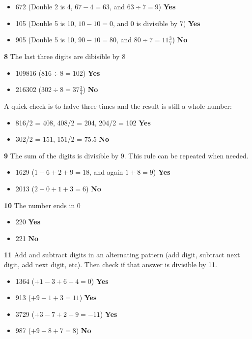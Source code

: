 \begin{itemize}
  \item 672 (Double 2 is 4, $67-4=63$, and $63 \div 7 = 9$) \textbf{Yes}
  \item 105 (Double 5 is 10, $10-10=0$, and 0 is divisible by 7) \textbf{Yes}
  \item 905 (Double 5 is 10, $90-10=80$, and $80 \div 7 =11\frac{3}{7}$) \textbf{No}
\end{itemize}

\vspace{7 mm}

\textbf{8} The last three digits are dibisible by 8

\begin{itemize}
  \item 109816 ($816 \div 8=102$) \textbf{Yes}
  \item 216302 ($302\div 8=37\frac{3}{4}$) \textbf{No}
\end{itemize}

A quick check is to halve three times and the result is still a whole number:

\begin{itemize}
  \item 816/2 = 408, 408/2 = 204, 204/2 = 102 \textbf{Yes}
  \item 302/2 = 151, 151/2 = 75.5 \textbf{No}
\end{itemize}

\vspace{7 mm}

\textbf{9} The sum of the digits is divisible by 9. This rule can be repeated when needed.

\begin{itemize}
  \item 1629 ($1+6+2+9=18$, and again $1+8=9$) \textbf{Yes}
  \item 2013 ($2+0+1+3=6$) \textbf{No}
\end{itemize}

\textbf{10} The number ends in 0

\begin{itemize}
  \item 220 \textbf{Yes}
  \item 221 \textbf{No}
\end{itemize}

\textbf{11} Add and subtract digits in an alternating pattern (add digit, subtract next digit, add next digit, etc). Then check if that answer is divisible by 11.

\begin{itemize}
  \item 1364 ($+1-3+6-4=0$) \textbf{Yes}
  \item 913 ($+9-1+3=11$) \textbf{Yes}
  \item 3729 ($+3-7+2-9=-11$) \textbf{Yes}
  \item 987 ($+9-8+7=8$) \textbf{No}
\end{itemize}

